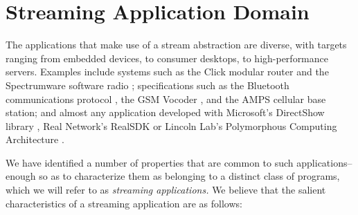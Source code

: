 \section{Streaming Application Domain}
\label{sec:domain}

The applications that make use of a stream abstraction are diverse,
with targets ranging from embedded devices, to consumer desktops, to
high-performance servers.  Examples include systems such as the Click
modular router \cite{click} and the Spectrumware software radio
\cite{spectrumware,softwareradio}; specifications such as the
Bluetooth communications protocol \cite{bluetooth}, the GSM Vocoder
\cite{gsm}, and the AMPS cellular base station\cite{amps}; and almost
any application developed with Microsoft's DirectShow library
\cite{directshow}, Real Network's RealSDK \cite{realsdk} or Lincoln
Lab's Polymorphous Computing Architecture \cite{pca}.

We have identified a number of properties that are common to such
applications--enough so as to characterize them as belonging to a
distinct class of programs, which we will refer to as {\it streaming
applications.}  We believe that the salient characteristics of a
streaming application are as follows:

